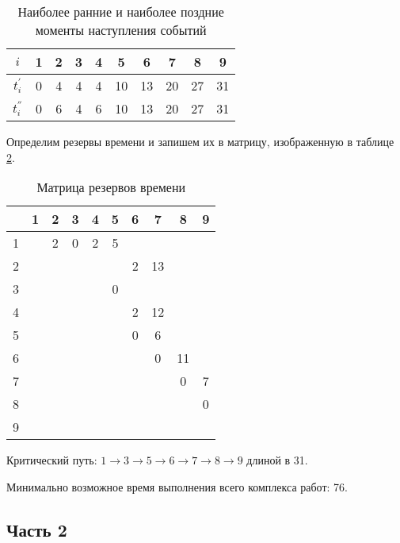 \begin{table}[H]
\begin{center}
	\def\tabcolsep{8pt}
	\caption{Наиболее ранние и наиболее поздние моменты наступления событий}
	\label{tab:earlylate}
	\begin{tabular}{|c|c|c|c|c|c|c|c|c|c|}
	\hline 
	$i$ & 1 & 2 & 3 & 4 & 5 & 6 & 7 & 8 & 9 \\ 
	\hline 
	$t^{'}_i$ & 0 & 4 & 4 & 4 & 10 & 13 & 20 & 27 & 31 \\ 
	\hline 
	$t^{''}_i$ & 0 & 6 & 4 & 6 & 10 & 13 & 20 & 27 & 31 \\ 
	\hline 
	\end{tabular}  
\end{center}
\end{table}

Определим резервы времени и запишем их в матрицу, изображенную в таблице \ref{tab:reserv}.

\begin{table}[H]
\begin{center}
	\def\tabcolsep{8pt}
	\caption{Матрица резервов времени}
	\label{tab:reserv}
	\begin{tabular}{|c|c|c|c|c|c|c|c|c|c|}
	\hline 
	 & 1 & 2 & 3 & 4 & 5 & 6 & 7 & 8 & 9 \\ 
	\hline 
	1 &  & 2 & 0 & 2 & 5  &  &  &  &  \\ 
	\hline 
	2 &  &  &  &  &  & 2 & 13  &  &  \\ 
	\hline 
	3 &  &  &  &  & 0 &  &  &  &  \\ 
	\hline 
	4 &  &  &  &  &  & 2 & 12 &  &  \\ 
	\hline 
	5 &  &  &  &  &  & 0 & 6 &  &  \\ 
	\hline 
	6 &  &  &  &  &  &  & 0 & 11 &  \\ 
	\hline 
	7 &  &  &  &  &  &  &  & 0 & 7 \\ 
	\hline 
	8 &  &  &  &  &  &  &  &  & 0 \\ 
	\hline 
	9 &  &  &  &  &  &  &  &  &  \\ 
	\hline 
	\end{tabular} 
\end{center}
\end{table}

Критический путь: $1 \rightarrow 3 \rightarrow 5 \rightarrow 6 \rightarrow 7 \rightarrow 8 \rightarrow 9$ длиной в 31.

Минимально возможное время выполнения всего комплекса работ: 76.

\subsection{Часть 2}


